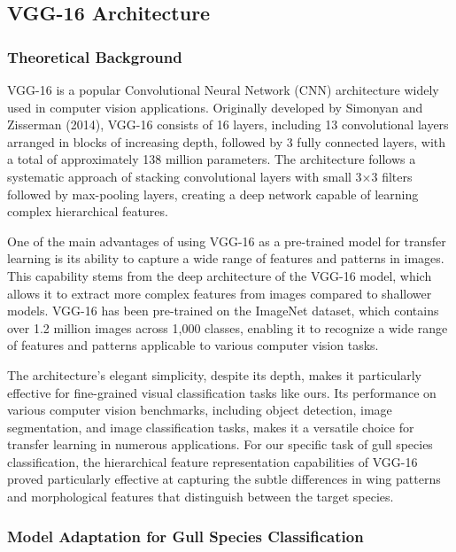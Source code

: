 


\subsection{VGG-16 Architecture}

\subsubsection{Theoretical Background}

VGG-16 is a popular Convolutional Neural Network (CNN) architecture widely used in computer vision applications. Originally developed by Simonyan and Zisserman (2014), VGG-16 consists of 16 layers, including 13 convolutional layers arranged in blocks of increasing depth, followed by 3 fully connected layers, with a total of approximately 138 million parameters. The architecture follows a systematic approach of stacking convolutional layers with small 3$\times$3 filters followed by max-pooling layers, creating a deep network capable of learning complex hierarchical features.

One of the main advantages of using VGG-16 as a pre-trained model for transfer learning is its ability to capture a wide range of features and patterns in images. This capability stems from the deep architecture of the VGG-16 model, which allows it to extract more complex features from images compared to shallower models. VGG-16 has been pre-trained on the ImageNet dataset, which contains over 1.2 million images across 1,000 classes, enabling it to recognize a wide range of features and patterns applicable to various computer vision tasks.

The architecture's elegant simplicity, despite its depth, makes it particularly effective for fine-grained visual classification tasks like ours. Its performance on various computer vision benchmarks, including object detection, image segmentation, and image classification tasks, makes it a versatile choice for transfer learning in numerous applications. For our specific task of gull species classification, the hierarchical feature representation capabilities of VGG-16 proved particularly effective at capturing the subtle differences in wing patterns and morphological features that distinguish between the target species.

\subsubsection{Model Adaptation for Gull Species Classification}

